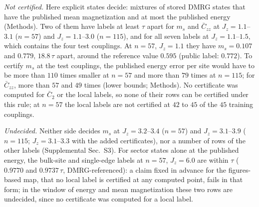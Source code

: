 \documentclass[aps,prx,twocolumn,10pt,superscriptaddress,nofootinbib,longbibliography,floatfix]{revtex4-2}
\theoremstyle{remark}
\newcommand{\Jz}{J_z}
\newcommand{\ms}{m_s}
\newcommand{\Czz}{\bar C_{zz}}
\newcommand{\Ctwo}{\bar C_{2}}
\begin{document}
\emph{Not certified.} Here explicit states decide: mixtures of stored DMRG states that have the published mean
magnetization and at most the published energy (Methods). Two of them have labels at least $\tau$ apart for $\ms$
and $\Czz$ at $\Jz=1.1$--$3.1$ ($n=57$) and $\Jz=1.1$--$3.0$ ($n=115$), and for all seven labels at $\Jz=1.1$--$1.5$, %
which contains the four test couplings. At $n=57$, $\Jz=1.1$ they have $\ms=0.107$ and $0.779$, $18.8\,\tau$ apart, %
around the reference value $0.595$ (public label: $0.772$). To certify $\ms$ at the test couplings, the published %
energy error per site would have to be more than $110$ times smaller at $n=57$ %
and more than $79$ times at $n=115$; for $\Czz$, more than $57$ and $49$ times (lower bounds; Methods). No %
certificate was computed for $\Ctwo$ or the local labels, so none of their rows can be certified under this rule; at
$n=57$ the local labels are not certified at $42$ to $45$ of the $45$ training couplings. %

\emph{Undecided.} Neither side decides $\ms$ at $\Jz=3.2$--$3.4$ ($n=57$) and $\Jz=3.1$--$3.9$ ($n=115$; $\Jz=3.1$--$3.3$ %
with the added certificates), nor a number of rows of the other labels (Supplemental Sec.~S3). For sector
states alone at the published energy, the bulk-site and single-edge labels at $n=57$, $\Jz=6.0$ are within $\tau$
($0.9770$ and $0.9737\,\tau$, DMRG-referenced): a claim fixed in advance for the figures-based map, that no local %
label is certified at any computed point, fails in that form; in the window of energy and mean magnetization these
two rows are undecided, since no certificate was computed for a local label.
\end{document}
